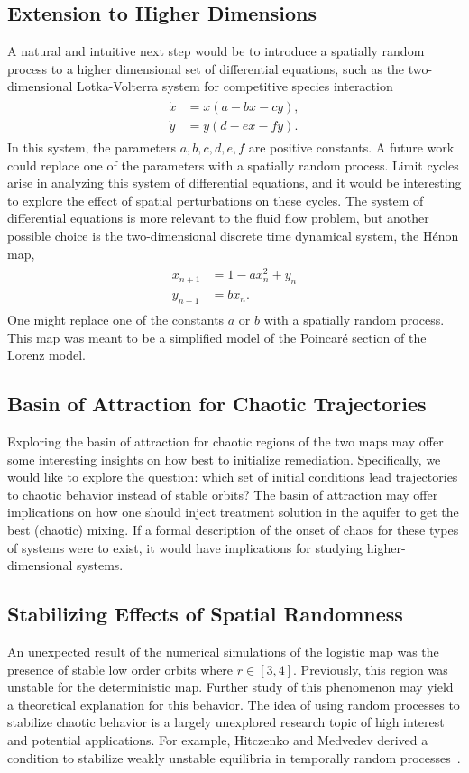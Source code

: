 \subsection{Extension to Higher Dimensions}
A natural and intuitive next step would be to introduce a spatially
random process to a higher dimensional set of differential equations, such as the
two-dimensional Lotka-Volterra
system for competitive species interaction
\begin{align}
\begin{split}
\dot{x} &= x(a-bx-cy),\\
\dot{y} &= y(d-ex-fy).
\end{split}
\end{align}
In this system, the parameters $a,b,c,d,e,f$ are positive
constants. A
future work could replace one of the parameters with a spatially
random process. Limit cycles arise in analyzing this system of
differential equations, and it would be interesting to explore the
effect of spatial perturbations on these cycles. The system of differential equations is more relevant to
the fluid flow problem, but another possible
choice is the two-dimensional discrete time dynamical system, the H\'{e}non map,
\begin{align}
\begin{split}
x_{n+1}&=1-ax_n^2+y_n\\
y_{n+1}&=bx_n.
\end{split}
\end{align}
One might replace one of the constants $a$ or $b$ with a spatially random
process. This map was meant to be a simplified model of the
Poincar\'{e} section of the Lorenz model. 
\subsection{Basin of Attraction for Chaotic Trajectories}
Exploring the basin of attraction for chaotic
regions of the two maps may offer some interesting insights on how
best to initialize remediation. Specifically, we would like to explore the
question: which set of initial conditions lead trajectories to chaotic
behavior instead of stable orbits? The basin of attraction may offer
implications on how one should inject treatment solution in the
aquifer to get the best (chaotic) mixing. If a formal description of
the onset of chaos for these types of systems were to exist, it would
have implications for studying higher-dimensional systems.
\subsection{Stabilizing Effects of Spatial Randomness}
An unexpected result of the numerical simulations of the logistic map
was the presence of stable low order orbits where $r \in
[3,4]$. Previously, this region was unstable for the deterministic
map. Further study of this phenomenon may yield a theoretical
explanation for this behavior. The idea of using random processes to
stabilize chaotic behavior is a largely unexplored research topic of
high interest and potential applications. For example, Hitczenko and Medvedev derived a condition to stabilize weakly
unstable equilibria in temporally random processes~\cite{hitczenko}.
